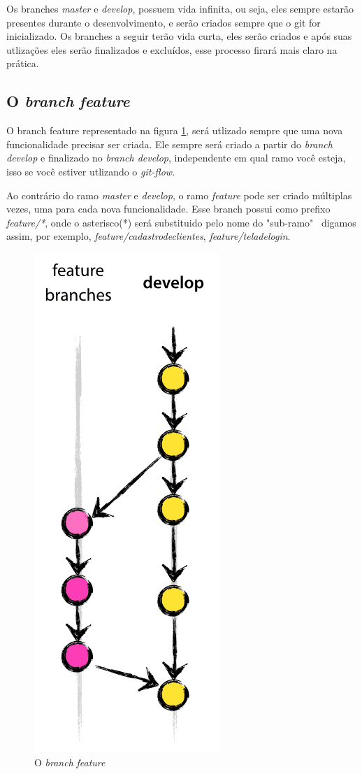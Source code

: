 \documentclass[12pt,openright,oneside,a4paper,english,brazil]{abntex2}
\begin{document}
Os branches \textit{master} e \textit{develop}, possuem vida infinita, ou seja, eles sempre estarão presentes durante o desenvolvimento, e serão criados sempre que o git for inicializado. Os branches a seguir terão vida curta, eles serão criados e após suas utlizações eles serão finalizados e excluídos, esse processo firará mais claro na prática.

\subsection{O \textit{branch} \textit{feature}}

O branch feature representado na figura \ref{feature}, será utlizado sempre que uma nova funcionalidade precisar ser criada. Ele sempre será criado a partir do\textit{ branch develop} e finalizado no \textit{branch develop}, independente em qual ramo você esteja, isso se você estiver utlizando o \textit{git-flow}.

Ao contrário do ramo \textit{master} e \textit{develop}, o ramo \textit{feature} pode ser criado múltiplas vezes, uma para cada nova funcionalidade. Esse branch possui como prefixo \textit{feature/*}, onde o asterisco(*) será substituido pelo nome do "sub-ramo" \ digamos assim, por exemplo, \textit{feature/cadastrodeclientes}, \textit{feature/teladelogin}.

\begin{figure}[h]
	\caption{\label{feature}O \textit{branch} \textit{feature}}
	\begin{center}
		\includegraphics[width=0.26\linewidth]{feature}
	\end{center}
\end{figure}
\end{document}
